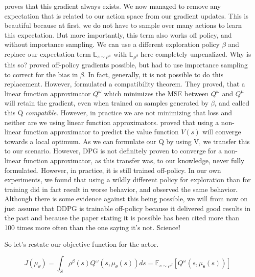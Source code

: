\documentclass[hyperref,beleg]{cgvpub}
\begin{document}
\cite[Theorem 1]{silverDeterministicPolicyGradient2013} proves that this gradient always exists. We now managed to remove any expectation that is related to our action space from our gradient updates. This is beautiful because at first, we do not have to sample over many actions to learn this expectation. But more importantly, this term also works off policy, and without importance sampling. We can use a different exploration policy $\beta$ and replace our expectation term $\mathbb{E}_{s \sim \rho^{\mu}}$ with $\mathbb{E}_{\rho^{\beta}}$ here completely unpenalized. Why is this so? \cite{degrisOffPolicyActorCritic2013} proved off-policy gradients possible, but had to use importance sampling to correct for the bias in $\beta$. In fact, generally, it is not possible to do this replacement. However, \cite[Section 4.3]{silverDeterministicPolicyGradient2013} formulated a compatibility theorem. They proved, that a linear function approximator $Q^{\omega}$ which minimizes the MSE between $Q^{\omega}$ and $Q^{\mu}$ will retain the gradient, even when trained on samples generated by $\beta$, and called this Q \textit{compatible}. However, in practice we are not minimizing that loss and neither are we using linear function approximators. \cite{bhatnagarConvergentTemporalDifferenceLearning2009} proved that using a non-linear function approximator to predict the value function $V(s)$ will converge towards a local optimum. As we can formulate our Q by using V, we transfer this to our scenario. However, \ac{DPG} is not definitely proven to converge for a non-linear function approximator, as this transfer was, to our knowledge, never fully formulated. However, in practice, it is still trained off-policy. In our own experiments, we found that using a wildly different policy for exploration than for training did in fact result in worse behavior, and \cite{fujimotoOffPolicyDeepReinforcement2019} observed the same behavior. Although there is some evidence against this being possible, we will from now on just assume that DDPG is trainable off-policy because it delivered good results in the past and because the paper stating it is possible has been cited more than 100 times more often than the one saying it's not. Science!

So let's restate our objective function for the actor.

\begin{equation}
J(\mu_{\theta}) = \int_S \rho^{\beta}(s) Q^{\omega}(s,\mu_{\theta}(s)) ds = \mathbb{E}_{s \sim \rho^{\beta}}[Q^{\omega}(s,\mu_{\theta}(s))]
\end{equation}
\end{document}

